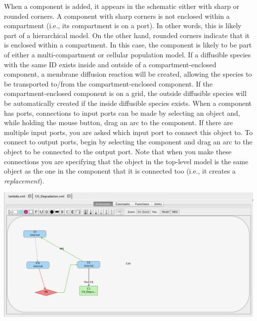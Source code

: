 \documentclass[titlepage,11pt]{article}
\begin{document}
When a component is added, it appears in the schematic either with sharp or rounded corners.  A component with sharp corners is not enclosed within a compartment (i.e., its compartment is on a port).  In other words, this is likely part of a hierarchical model.  On the other hand, rounded corners indicate that it is enclosed within a compartment.  In this case, the component is likely to be part of either a multi-compartment or cellular population model.  If a diffusible species with the same ID exists inside and outside of a compartment-enclosed component, a membrane diffusion reaction will be created, allowing the species to be transported to/from the compartment-enclosed component.  If the compartment-enclosed component is on a grid, the outside diffusible species will be automatically created if the inside diffusible species exists.  
When a component has ports, connections to input ports can be made by selecting an object and, while holding the mouse button, drag an arc to the component.  If there are multiple input ports, you are asked which input port to connect this object to.  To connect to output ports, begin by selecting the component and drag an arc to the object to be connected to the output port.  Note that when you make these connections you are specifying that the object in the top-level model is the same object as the one in the component that it is connected too (i.e., it creates a \emph{replacement}).    

\begin{center}
\includegraphics[width=160mm]{screenshots/addPort}
\end{center}
\end{document}
